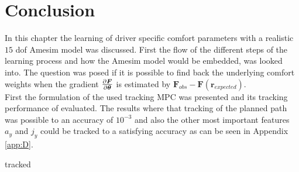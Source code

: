 \section{Conclusion}
In this chapter the learning of driver specific comfort parameters with a realistic $15$ dof Amesim model was discussed. First the flow of the different steps of the learning process and how the Amesim model would be embedded, was looked into. The question was posed if it is possible to find back the underlying comfort weights when the gradient $\pdv{\bm{F}}{\bm{\theta}}$ is estimated by $ \bm{F}_{obs} - \bm{F}(\bm{r}_{expected})$. \\
First the formulation of the used tracking MPC was presented and its tracking performance of evaluated. The results where that tracking of the planned path was possible to an accuracy of $10^{-3}$ and also the other most important features $a_y$ and $j_y$ could be tracked to a satisfying accuracy as can be seen in Appendix \ref{app:D}.

tracked 









